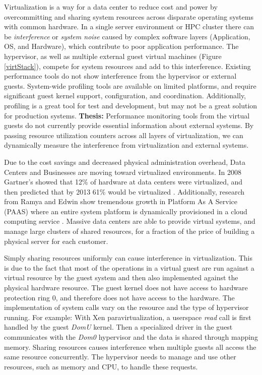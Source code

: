 Virtualization is a way for a data center to reduce cost and power by overcommitting and sharing system resources across disparate operating systems with common hardware.  
In a single server environment or HPC cluster there can be \emph{interference} \cite{paul} or \emph{system noise}\cite{tsafrir} caused by complex software layers (Application, OS, and Hardware), which contribute to poor application performance.  
The hypervisor, as well as multiple external guest virtual machines (Figure \ref{virtStack}), compete for system resources and add to this interference.  
Existing performance tools do not show interference from the hypervisor or external guests.  
System-wide profiling tools are available on limited platforms, and require significant guest kernel support, configuration, and coordination.  
Additionally, profiling is a great tool for test and development, but may not be a great solution for production systems.
\textbf{Thesis:  }Performance monitoring tools from the virtual guests do not currently provide essential information about external systems.  By passing resource utilization counters across all layers of virtualization, we can dynamically measure the interference from virtualization and external systems.

\indent Due to the cost savings and decreased physical administration overhead, Data Centers and Businesses are moving toward virtualized environments.  In 2008 Gartner’s showed that 12\% of hardware at data centers were virtualized, and then predicted that by 2013 61\% would be virtualized \cite{gartners}.   Additionally, research from Ramya and Edwin show tremendous growth in Platform As A Service (PAAS) where an entire system platform is dynamically provisioned in a cloud computing service \cite{ramya}.   Massive data centers are able to provide virtual systems, and manage large clusters of shared resources, for a fraction of the price of building a physical server for each customer.

\indent Simply sharing resources uniformly can cause interference in virtualization.  This is due to the fact that most of the operations in a virtual guest are run against a virtual resource by the guest system and then also implemented against the physical hardware resource.  The guest kernel does not have access to hardware protection ring 0, and therefore does not have access to the hardware.  The implementation of system calls vary on the resource and the type of hypervisor running.  For example:  With Xen paravirtualization, a userspace \emph{read} call is first handled by the guest \emph{DomU} kernel.  Then a specialized driver in the guest communicates with the \emph{Dom0} hypervisor and the data is shared through mapping memory.  Sharing resources causes interference when multiple guests all access the same resource concurrently.  The hypervisor needs to manage and use other resources, such as memory and CPU, to handle these requests.

